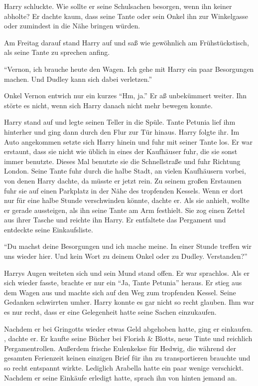 Harry schluckte. Wie sollte er seine Schulsachen besorgen, wenn ihn keiner abholte? Er dachte kaum, dass seine Tante oder sein Onkel ihn zur Winkelgasse oder zumindest in die Nähe bringen würden.

Am Freitag darauf stand Harry auf und saß wie gewöhnlich am Frühstückstisch, als seine Tante zu sprechen anfing.

\enquote{Vernon, ich brauche heute den Wagen. Ich gehe mit Harry ein paar Besorgungen machen. Und Dudley kann sich dabei verletzen.}

Onkel Vernon entwich nur ein kurzes \enquote{Hm, ja.} Er aß unbekümmert weiter. Ihn störte es nicht, wenn sich Harry danach nicht mehr bewegen konnte.

Harry stand auf und legte seinen Teller in die Spüle. Tante Petunia lief ihm hinterher und ging dann durch den Flur zur Tür hinaus. Harry folgte ihr. Im Auto angekommen setzte sich Harry hinein und fuhr mit seiner Tante los. Er war erstaunt, dass sie nicht wie üblich in eines der Kaufhäuser fuhr, die sie sonst immer benutzte. Dieses Mal benutzte sie die Schnellstraße und fuhr Richtung London.  Seine Tante fuhr durch die halbe Stadt, an vielen Kaufhäusern vorbei, von denen Harry dachte, da müsste er jetzt rein. Zu seinem großen Erstaunen fuhr sie auf einen Parkplatz in der Nähe des tropfenden Kessels. Wenn er dort nur für eine halbe Stunde verschwinden könnte, dachte er. Als sie anhielt, wollte er gerade aussteigen, als ihn seine Tante am Arm festhielt. Sie zog einen Zettel aus ihrer Tasche und reichte ihn Harry. Er entfaltete das Pergament und entdeckte seine Einkaufsliste.

\enquote{Du machst deine Besorgungen und ich mache meine. In einer Stunde treffen wir uns wieder hier. Und \gst kein Wort zu deinem Onkel oder zu Dudley. Verstanden?}

Harrys Augen weiteten sich und sein Mund stand offen. Er war sprachlos. Als er sich wieder fasste, brachte er nur ein \enquote{Ja, Tante Petunia} heraus. Er stieg aus dem Wagen aus und machte sich auf den Weg zum tropfenden Kessel. Seine Gedanken schwirrten umher.  Harry konnte es gar nicht so recht glauben. Ihm war es nur recht, dass er eine Gelegenheit hatte seine Sachen einzukaufen.

Nachdem er bei Gringotts wieder etwas Geld abgehoben hatte, ging er einkaufen. , dachte er. Er kaufte seine Bücher bei Florish \& Blotts, neue Tinte und reichlich Pergamentrollen. Außerdem frische Eulenkekse für Hedwig, die während der gesamten Ferienzeit keinen einzigen Brief für ihn zu transportieren brauchte und so recht entspannt wirkte. Lediglich Arabella hatte ein paar wenige verschickt. Nachdem er seine Einkäufe erledigt hatte, sprach ihn von hinten jemand an.

